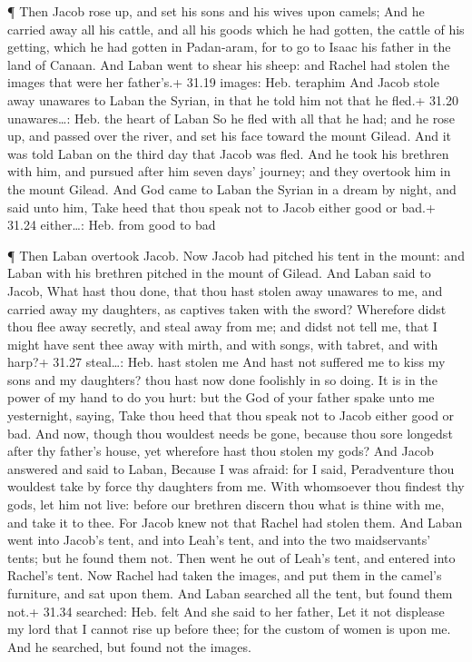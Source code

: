  ¶ Then Jacob rose up, and set his sons and his wives upon
camels;  And he carried away all his cattle, and all his
goods which he had gotten, the cattle of his getting, which he had
gotten in Padan-aram, for to go to Isaac his father in the land of
Canaan.  And Laban went to shear his sheep: and Rachel had
stolen the images that were her father's.+ 31.19 images: Heb. teraphim
 And Jacob stole away unawares to Laban the Syrian, in that
he told him not that he fled.+ 31.20 unawares\ldots: Heb. the heart of
Laban  So he fled with all that he had; and he rose up, and
passed over the river, and set his face toward the mount Gilead.
 And it was told Laban on the third day that Jacob was
fled.  And he took his brethren with him, and pursued after
him seven days' journey; and they overtook him in the mount Gilead.
 And God came to Laban the Syrian in a dream by night, and
said unto him, Take heed that thou speak not to Jacob either good or
bad.+ 31.24 either\ldots: Heb. from good to bad

 ¶ Then Laban overtook Jacob. Now Jacob had pitched his
tent in the mount: and Laban with his brethren pitched in the mount of
Gilead.  And Laban said to Jacob, What hast thou done, that
thou hast stolen away unawares to me, and carried away my daughters, as
captives taken with the sword?  Wherefore didst thou flee
away secretly, and steal away from me; and didst not tell me, that I
might have sent thee away with mirth, and with songs, with tabret, and
with harp?+ 31.27 steal\ldots: Heb. hast stolen me  And
hast not suffered me to kiss my sons and my daughters? thou hast now
done foolishly in so doing.  It is in the power of my hand
to do you hurt: but the God of your father spake unto me yesternight,
saying, Take thou heed that thou speak not to Jacob either good or bad.
 And now, though thou wouldest needs be gone, because thou
sore longedst after thy father's house, yet wherefore hast thou stolen
my gods?  And Jacob answered and said to Laban, Because I
was afraid: for I said, Peradventure thou wouldest take by force thy
daughters from me.  With whomsoever thou findest thy gods,
let him not live: before our brethren discern thou what is thine with
me, and take it to thee. For Jacob knew not that Rachel had stolen them.
 And Laban went into Jacob's tent, and into Leah's tent,
and into the two maidservants' tents; but he found them not. Then went
he out of Leah's tent, and entered into Rachel's tent.  Now
Rachel had taken the images, and put them in the camel's furniture, and
sat upon them. And Laban searched all the tent, but found them not.+
31.34 searched: Heb. felt  And she said to her father, Let
it not displease my lord that I cannot rise up before thee; for the
custom of women is upon me. And he searched, but found not the images.

